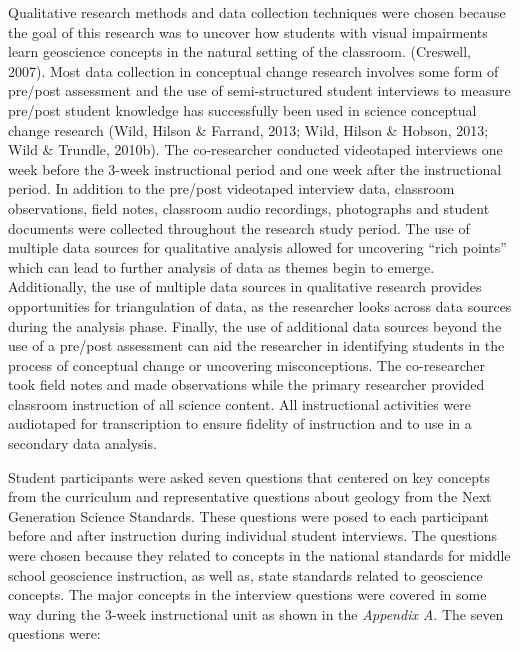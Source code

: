 \documentclass[11.5pt]{sig-alternate} %
\begin{document}
\begin{large}
Qualitative research methods and data collection techniques were chosen because the goal of this research was to uncover how students with visual impairments learn geoscience concepts in the natural setting of the classroom. (Creswell, 2007).  Most data collection in conceptual change research involves some form of pre/post assessment and the use of semi-structur\-ed student interviews to measure pre/post student knowledge has successfully been used in science conceptual change research (Wild, Hilson \& Farrand, 2013; Wild, Hilson \& Hobson, 2013; Wild \& Trundle, 2010b). The co-researcher conducted videotaped interviews one week before the 3-week instructional period and one week after the instructional period.  In addition to the pre/post videotaped interview data, classroom observations, field notes, classroom audio recordings, photographs and student documents were collected throughout the research study period.  The use of multiple data sources for qualitative analysis allowed for uncovering “rich points” which can lead to further analysis of data as themes begin to emerge.  Additionally, the use of multiple data sources in qualitative research provides opportunities for triangulation of data, as the researcher looks across data sources during the analysis phase. Finally, the use of additional data sources beyond the use of a pre/post assessment can aid the researcher in identifying students in the process of conceptual change or uncovering misconceptions.  The co-researcher took field notes and made observations while the primary researcher provided classroom instruction of all science content.  All instructional activities were audiotaped for transcription to ensure fidelity of instruction and to use in a secondary data analysis.  

Student participants were asked seven questions that centered on key concepts from the curriculum and representative questions about geology from the Next Generation Science Standards.  These questions were posed to each participant before and after instruction during individual student interviews. The questions were chosen because they related to concepts in the national standards for middle school geoscience instruction, as well as, state standards related to geoscience concepts.  The major concepts in the interview questions were covered in some way during the 3-week instructional unit as shown in the \textit{Appendix A}.  The seven questions were:  


\end{large}
\end{document}
